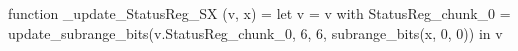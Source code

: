 function _update_StatusReg_SX (v, x) = let v = { v with StatusReg_chunk_0 = update_subrange_bits(v.StatusReg_chunk_0, 6, 6, subrange_bits(x, 0, 0)) } in
  v

